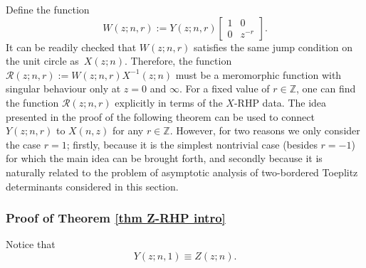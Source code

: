\documentclass[10pt,a4paper]{amsart}
\numberwithin{equation}{section}
\newcommand{\Z}{{\mathbb Z}}
\begin{document}
	Define the function
	\begin{equation}\label{WY}
		W(z;n,r):= Y(z;n,r) \begin{bmatrix}
			1 & 0 \\
			0 & z^{-r}
		\end{bmatrix}.
	\end{equation}
	It can be readily checked that $W(z;n,r)$ satisfies the same jump condition on the unit circle as~$X(z;n)$. Therefore, the function $\mathscr{R}(z;n,r) := W(z;n,r)X^{-1}(z;n)$
	must be a meromorphic function with singular behaviour only at $z=0$ and $\infty$. For a fixed value of $r \in \Z$, one can find the function $\mathscr{R}(z;n,r)$ explicitly in terms of the $X$-RHP data. The idea presented in the proof of the following theorem can be used to connect $Y(z;n,r)$ to $X(n,z)$ for any $r \in \Z$. However, for two reasons we only consider the case $r=1$; firstly, because it is the simplest nontrivial case (besides $r=-1$) for which the main idea can be brought forth, and secondly because it is naturally related to the problem of asymptotic analysis of two-bordered Toeplitz determinants considered in this section.
	
\subsubsection{Proof of Theorem \ref{thm Z-RHP intro}}\label{sec proof of thm 1.6}
	Notice that
	\begin{equation}\label{YZ}
		Y(z;n,1) \equiv Z(z;n).
	\end{equation}
	
\end{document}
